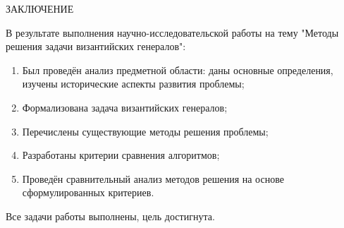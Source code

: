 \begin{center}
    \MakeUppercase{\large Заключение}
\end{center}

В результате выполнения научно-исследовательской работы на тему "Методы решения задачи византийских генералов":

\begin{enumerate}

\item Был проведён анализ предметной области: даны основные определения, изучены исторические аспекты развития проблемы;

\item Формализована задача византийских генералов;

\item Перечислены существующие методы решения проблемы;

\item Разработаны критерии сравнения алгоритмов;

\item Проведён сравнительный анализ методов решения на основе сформулированных критериев.

\end{enumerate}

Все задачи работы выполнены, цель достигнута.

\newpage
